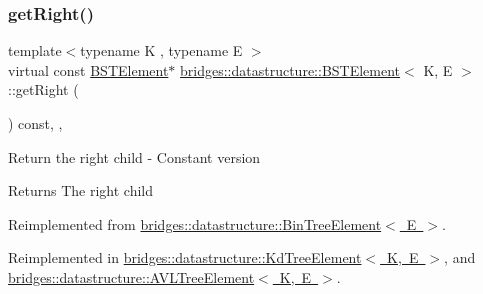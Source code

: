\mbox{\label{classbridges_1_1datastructure_1_1_b_s_t_element_a012f0eb09c3d62b14c73109e6ded0879}} 
\subsubsection{\texorpdfstring{getRight()}{getRight()}\hspace{0.1cm}{\footnotesize\ttfamily [2/2]}}
{\footnotesize\ttfamily template$<$typename K , typename E $>$ \\
virtual const \mbox{\hyperlink{classbridges_1_1datastructure_1_1_b_s_t_element}{B\+S\+T\+Element}}$\ast$ \mbox{\hyperlink{classbridges_1_1datastructure_1_1_b_s_t_element}{bridges\+::datastructure\+::\+B\+S\+T\+Element}}$<$ K, E $>$\+::get\+Right (\begin{DoxyParamCaption}{ }\end{DoxyParamCaption}) const\hspace{0.3cm}{\ttfamily [inline]}, {\ttfamily [override]}, {\ttfamily [virtual]}}

Return the right child -\/ Constant version \begin{DoxyReturn}{Returns}
The right child 
\end{DoxyReturn}


Reimplemented from \mbox{\hyperlink{classbridges_1_1datastructure_1_1_bin_tree_element_a795b1696d628b55dafb2bc1aa961843a}{bridges\+::datastructure\+::\+Bin\+Tree\+Element$<$ E $>$}}.



Reimplemented in \mbox{\hyperlink{classbridges_1_1datastructure_1_1_kd_tree_element_ae8d6007d3848b72cbfc11d2e29120781}{bridges\+::datastructure\+::\+Kd\+Tree\+Element$<$ K, E $>$}}, and \mbox{\hyperlink{classbridges_1_1datastructure_1_1_a_v_l_tree_element_a5a2c4b96b51da1daa3c0426882250acb}{bridges\+::datastructure\+::\+A\+V\+L\+Tree\+Element$<$ K, E $>$}}.

\mbox{\label{classbridges_1_1datastructure_1_1_b_s_t_element_a06d80480736ae19052e2d1bc6345323a}} 
